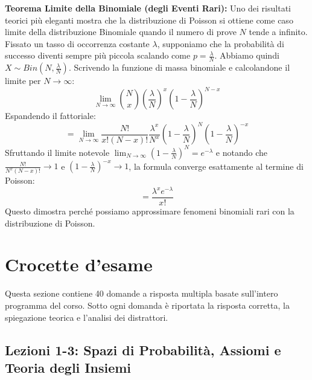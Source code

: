 \documentclass[12pt, a4paper]{article}
\begin{document}
\textbf{Teorema Limite della Binomiale (degli Eventi Rari):}
Uno dei risultati teorici più eleganti mostra che la distribuzione di Poisson si ottiene come caso limite della distribuzione Binomiale quando il numero di prove $N$ tende a infinito.
Fissato un tasso di occorrenza costante $\lambda$, supponiamo che la probabilità di successo diventi sempre più piccola scalando come $p = \frac{\lambda}{N}$. Abbiamo quindi $X \sim Bin(N, \frac{\lambda}{N})$. 
Scrivendo la funzione di massa binomiale e calcolandone il limite per $N \to \infty$:
$$ \lim_{N \to \infty} \binom{N}{x} \left(\frac{\lambda}{N}\right)^x \left(1-\frac{\lambda}{N}\right)^{N-x} $$
Espandendo il fattoriale:
$$ = \lim_{N \to \infty} \frac{N!}{x!(N-x)!} \frac{\lambda^x}{N^x} \left(1-\frac{\lambda}{N}\right)^N \left(1-\frac{\lambda}{N}\right)^{-x} $$
Sfruttando il limite notevole $\lim_{N \to \infty} \left(1-\frac{\lambda}{N}\right)^N = e^{-\lambda}$ e notando che $\frac{N!}{N^x (N-x)!} \to 1$ e $(1-\frac{\lambda}{N})^{-x} \to 1$, la formula converge esattamente al termine di Poisson:
$$ = \frac{\lambda^x e^{-\lambda}}{x!} $$
Questo dimostra perché possiamo approssimare fenomeni binomiali rari con la distribuzione di Poisson.


\section*{Crocette d'esame}

Questa sezione contiene 40 domande a risposta multipla basate sull'intero programma del corso. Sotto ogni domanda è riportata la risposta corretta, la spiegazione teorica e l'analisi dei distrattori.

\subsection*{Lezioni 1-3: Spazi di Probabilità, Assiomi e Teoria degli Insiemi}
\end{document}
